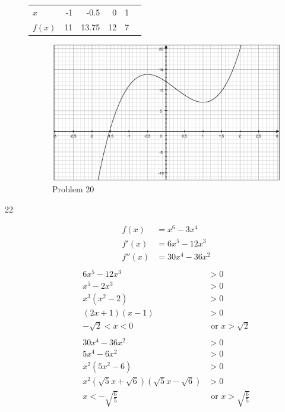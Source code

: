 \documentclass[fleqn]{exam}
\begin{document}
\begin{description}
\begin{tabular}{lrrrrr}
\toprule
$x$    & -1 & -0.5  &  0 & 1 \\
$f(x)$ & 11 & 13.75 & 12 & 7 \\
\bottomrule
\end{tabular}

\begin{figure}[H]
  \centering
  \includegraphics[scale=.3]{problem_20.eps}
  \caption*{Problem 20}
\end{figure}

\item[22]
\begin{align*}
  f(x)   &= x^6 - 3x^4    \\
  f'(x)  &= 6x^5 - 12x^3  \\
  f''(x) &= 30x^4 - 36x^2 \\
\end{align*}
\begin{align*}
  6x^5 - 12x^3 &> 0 \\
  x^5 - 2x^3 &> 0 \\
  x^3(x^2 - 2) &> 0 \\
  (2x + 1)(x - 1) &> 0 \\
  -\sqrt{2} < x < 0& \text{ or } x > \sqrt{2} \\
\\
  30x^4 - 36x^2 &> 0 \\
  5x^4 - 6x^2 &> 0 \\
  x^2(5x^2 - 6) &> 0 \\
  x^2 (\sqrt{5}x + \sqrt{6}) (\sqrt{5}x - \sqrt{6}) &> 0 \\
  x < -\sqrt{\frac{6}{5}} & \text{ or } x > \sqrt{\frac{6}{5}} \\
\end{align*}


\end{description}
\end{document}
